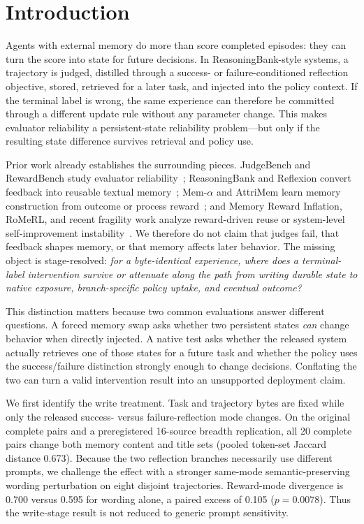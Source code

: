 \section{Introduction}
Agents with external memory do more than score completed episodes: they can turn the score into state for future decisions. In ReasoningBank-style systems, a trajectory is judged, distilled through a success- or failure-conditioned reflection objective, stored, retrieved for a later task, and injected into the policy context. If the terminal label is wrong, the same experience can therefore be committed through a different update rule without any parameter change. This makes evaluator reliability a persistent-state reliability problem---but only if the resulting state difference survives retrieval and policy use.

Prior work already establishes the surrounding pieces. JudgeBench and RewardBench study evaluator reliability~\citep{tan2025judgebench,lambert2024rewardbench}; ReasoningBank and Reflexion convert feedback into reusable textual memory~\citep{ouyang2026reasoningbank,shinn2023reflexion}; Mem-$\alpha$ and AttriMem learn memory construction from outcome or process reward~\citep{wang2025memalpha,li2026attrimem}; and Memory Reward Inflation, RoMeRL, and recent fragility work analyze reward-driven reuse or system-level self-improvement instability~\citep{asadolahi2026inflation,yang2026romerl,ye2026fragility}. We therefore do not claim that judges fail, that feedback shapes memory, or that memory affects later behavior. The missing object is stage-resolved: \emph{for a byte-identical experience, where does a terminal-label intervention survive or attenuate along the path from writing durable state to native exposure, branch-specific policy uptake, and eventual outcome?}

This distinction matters because two common evaluations answer different questions. A forced memory swap asks whether two persistent states \emph{can} change behavior when directly injected. A native test asks whether the released system actually retrieves one of those states for a future task and whether the policy uses the success/failure distinction strongly enough to change decisions. Conflating the two can turn a valid intervention result into an unsupported deployment claim.

We first identify the write treatment. Task and trajectory bytes are fixed while only the released success- versus failure-reflection mode changes. On the original complete pairs and a preregistered 16-source breadth replication, all 20 complete pairs change both memory content and title sets (pooled token-set Jaccard distance 0.673). Because the two reflection branches necessarily use different prompts, we challenge the effect with a stronger same-mode semantic-preserving wording perturbation on eight disjoint trajectories. Reward-mode divergence is 0.700 versus 0.595 for wording alone, a paired excess of 0.105 ($p=0.0078$). Thus the write-stage result is not reduced to generic prompt sensitivity.

